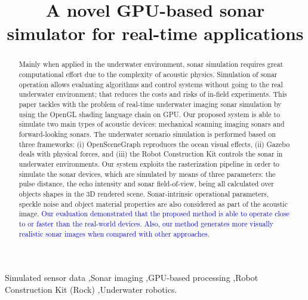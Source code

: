 \documentclass[final,5p,times]{elsarticle}
\begin{document}
\begin{frontmatter}


\title{A novel GPU-based sonar simulator for real-time applications}



\begin{abstract}

Mainly when applied in the underwater environment, sonar simulation requires great computational effort due to the complexity of acoustic physics. Simulation of sonar operation allows evaluating algorithms and control systems without going to the real underwater environment; that reduces the costs and risks of in-field experiments. This paper tackles with the problem of real-time underwater imaging sonar simulation by using the OpenGL shading language chain on GPU. Our proposed system is able to simulate two main types of acoustic devices: mechanical scanning imaging sonars and forward-looking sonars. The underwater scenario simulation is performed based on three frameworks: (i) OpenSceneGraph reproduces the ocean visual effects, (ii) Gazebo deals with physical forces, and (iii) the Robot Construction Kit controls the sonar in underwater environments. Our system exploits the rasterization pipeline in order to simulate the sonar devices, which are simulated by means of three parameters: the pulse distance, the echo intensity and sonar field-of-view, being all calculated over objects shapes in the 3D rendered scene. Sonar-intrinsic operational parameters, speckle noise and object material properties are also considered as part of the acoustic image. \textcolor{blue}{Our evaluation demonstrated that the proposed method is able to operate close to or faster than the real-world devices. Also, our method generates more visually realistic sonar images when compared with other approaches.}

\end{abstract}

\begin{keyword}
Simulated sensor data
\sep Sonar imaging
\sep GPU-based processing
\sep Robot Construction Kit (Rock)
\sep Underwater robotics.

\end{keyword}

\end{frontmatter}
\end{document}
